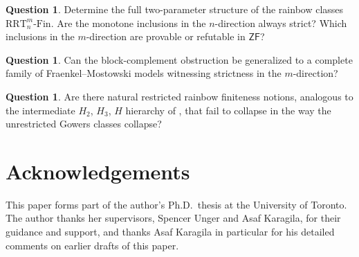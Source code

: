 \documentclass[11pt]{amsart}
\theoremstyle{definition}
\newtheorem{question}[theorem]{Question}
\newcommand{\ZF}{\mathsf{ZF}}
\newcommand{\RRT}{\mathrm{RRT}}
\newcommand{\RRTFin}[2]{\RRT^{#1}_{#2}\text{-}\mathrm{Fin}}
\begin{document}
\begin{question}
Determine the full two-parameter structure of the rainbow classes \(\RRTFin{m}{n}\).  Are the monotone inclusions in the \(n\)-direction always strict?  Which inclusions in the \(m\)-direction are provable or refutable in \(\ZF\)?
\end{question}

\begin{question}
Can the block-complement obstruction be generalized to a complete family of Fraenkel--Mostowski models witnessing strictness in the \(m\)-direction?
\end{question}

\begin{question}
Are there natural restricted rainbow finiteness notions, analogous to the intermediate \(H_2\), \(H_3\), \(H\) hierarchy of \cite{BCF}, that fail to collapse in the way the unrestricted Gowers classes collapse?
\end{question}

\section*{Acknowledgements}

This paper forms part of the author's Ph.D.\ thesis at the University of Toronto.  The author thanks her supervisors, Spencer Unger and Asaf Karagila, for their guidance and support, and thanks Asaf Karagila in particular for his detailed comments on earlier drafts of this paper.



\end{document}
